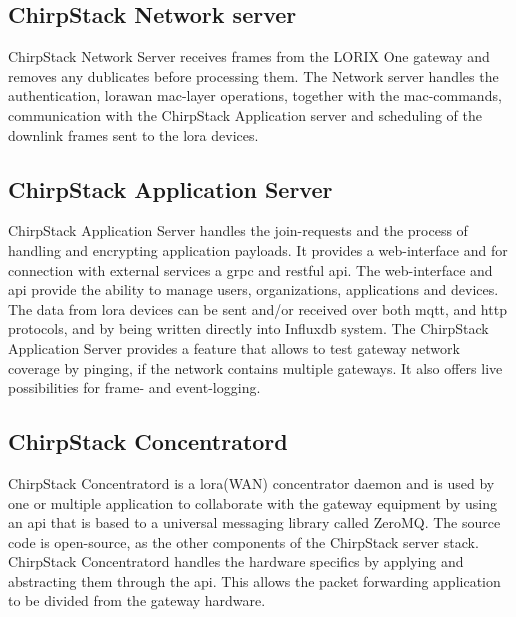 \subsection{ChirpStack Network server}
ChirpStack Network Server receives frames from the LORIX One gateway and removes any dublicates before processing them.
The Network server handles the authentication, \gls{lorawan} \gls{mac}-layer operations, together with the \gls{mac}-commands, communication with the ChirpStack Application server and scheduling of the downlink frames sent to the \gls{lora} devices.
\cite{chirpstack:networkServer}

\subsection{ChirpStack Application Server}

ChirpStack Application Server handles the join-requests and the process of handling and encrypting application payloads.
It provides a web-interface and for connection with external services a \gls{grpc} and \gls{rest}ful \gls{api}.
The web-interface and \gls{api} provide the ability to manage users, organizations, applications and devices.
The data from \gls{lora} devices can be sent and/or received over both \gls{mqtt}, and \gls{http} protocols, and by being  written directly into Influx\gls{db} system.
The ChirpStack Application Server provides a feature that allows to test gateway network coverage by pinging, if the network contains multiple gateways.
It also offers live possibilities for frame- and event-logging.
\cite{chirpstack:applicationServer}

\subsection{ChirpStack Concentratord}
ChirpStack Concentratord is a \gls{lora}(WAN) concentrator daemon and is used by one or multiple application to collaborate with the gateway equipment by using an \gls{api} that is based to a universal messaging library called ZeroMQ.
The source code is open-source, as the other components of the ChirpStack server stack.
ChirpStack Concentratord handles the hardware specifics by applying and abstracting them through the \gls{api}.
This allows the packet forwarding application to be divided from the gateway hardware.
\cite{chirpstack:concentratord}

